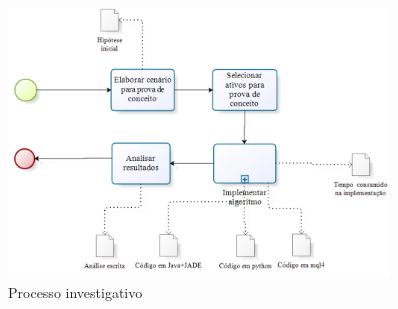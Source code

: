 \begin{figure}[h]
\centering
\label{f12}
\includegraphics[width=0.9\textwidth]{figuras/f09}
\caption{Processo investigativo }

\end{figure}

